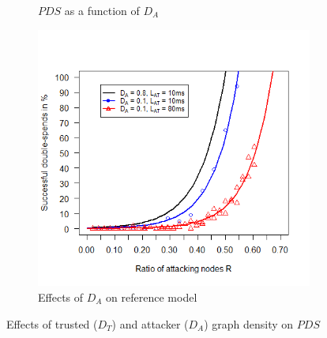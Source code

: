 \documentclass[a4paper,12pt,twoside]{report}
\begin{document}
\begin{figure}[!ht]
\begin{subfigure}{.5\textwidth}
  \caption{$PDS$ as a function of $D_{A}$}
  \label{attdens:a}
\end{subfigure}%
\begin{subfigure}{.5\textwidth}
  \centering
  \includegraphics[width=\linewidth]{Experiments/AttDensity/attdensrat.png}
  \caption{Effects of $D_{A}$ on reference model}
  \label{attdens:b}
\end{subfigure}
\caption{Effects of trusted ($D_{T}$) and attacker ($D_{A}$) graph density on $PDS$}
\label{densplot}
\end{figure}
\end{document}
